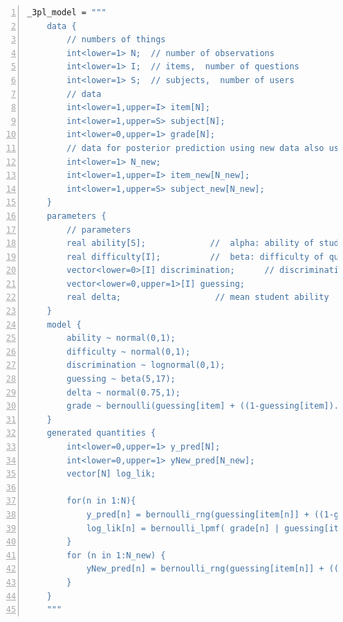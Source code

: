 \begin{lstlisting}[language=Stan,caption={Code Stan pour 3PL},basicstyle=\scriptsize, frame=lines,framesep=4.5mm,framexleftmargin=2.5mm,tabsize=2,numbers=left,fillcolor=\color{white},rulecolor=\color{black},numberstyle=\normalfont\scriptsize\color{black}]
    _3pl_model = """
    data {
        // numbers of things
        int<lower=1> N;  // number of observations
        int<lower=1> I;  // items,  number of questions  
        int<lower=1> S;  // subjects,  number of users 
        // data
        int<lower=1,upper=I> item[N];
        int<lower=1,upper=S> subject[N];
        int<lower=0,upper=1> grade[N];
        // data for posterior prediction using new data also used for Cross-validation
        int<lower=1> N_new;
        int<lower=1,upper=I> item_new[N_new];
        int<lower=1,upper=S> subject_new[N_new];
    }
    parameters {
        // parameters
        real ability[S];             //  alpha: ability of student
        real difficulty[I];          //  beta: difficulty of question
        vector<lower=0>[I] discrimination;      // discrimination of question
        vector<lower=0,upper=1>[I] guessing;    
        real delta;                   // mean student ability
    }
    model {
        ability ~ normal(0,1);         
        difficulty ~ normal(0,1);   
        discrimination ~ lognormal(0,1);
        guessing ~ beta(5,17);
        delta ~ normal(0.75,1);
        grade ~ bernoulli(guessing[item] + ((1-guessing[item]).*(inv_logit(discrimination[item] .* (ability[subject] - (difficulty[item] + delta))))));
    }
    generated quantities {
        int<lower=0,upper=1> y_pred[N];
        int<lower=0,upper=1> yNew_pred[N_new];
        vector[N] log_lik;

        for(n in 1:N){
            y_pred[n] = bernoulli_rng(guessing[item[n]] + ((1-guessing[item[n]]) * (inv_logit(discrimination[item[n]] .* (ability[subject[n]] - (difficulty[item[n]] + delta))))));
            log_lik[n] = bernoulli_lpmf( grade[n] | guessing[item[n]] + ((1-guessing[item[n]]) * (inv_logit(discrimination[item[n]] .* (ability[subject[n]] - (difficulty[item[n]] + delta))))));
        }
        for (n in 1:N_new) {
            yNew_pred[n] = bernoulli_rng(guessing[item[n]] + ((1-guessing[item[n]]) * (inv_logit(discrimination[item[n]] .* (ability[subject[n]] - (difficulty[item[n]] + delta))))));                                             
        }
    }
    """
\end{lstlisting}

